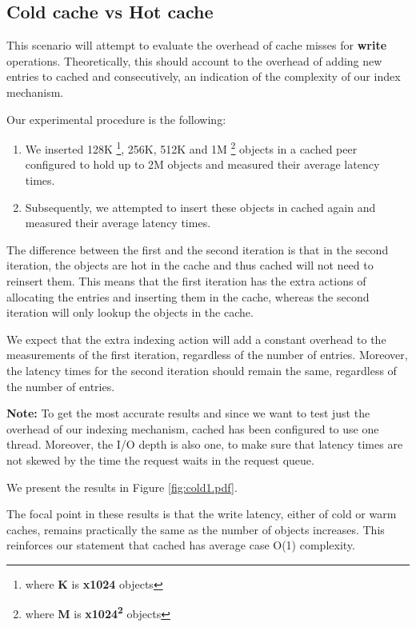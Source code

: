 \subsection{Cold cache vs Hot cache}

This scenario will attempt to evaluate the overhead of cache misses for 
\textbf{write} operations. Theoretically, this should account to the overhead 
of adding new entries to cached and consecutively, an indication of the 
complexity of our index mechanism.

Our experimental procedure is the following:

\begin{enumerate}
	\item We inserted 128K
		\footnote{where \textbf{K} is \textbf{x1024} objects}, 256K, 512K and 
		1M
		\footnote{where \textbf{M} is \textbf{x1024\textsuperscript{2}} 
			objects}
		objects in a cached peer configured to hold up to 2M objects and 
		measured their average latency times.
	\item Subsequently, we attempted to insert these objects in cached again 
		and measured their average latency times.
\end{enumerate}

The difference between the first and the second iteration is that in the second 
iteration, the objects are hot in the cache and thus cached will not need to 
reinsert them. This means that the first iteration has the extra actions of 
allocating the entries and inserting them in the cache, whereas the second 
iteration will only lookup the objects in the cache.

We expect that the extra indexing action will add a constant overhead to the 
measurements of the first iteration, regardless of the number of entries.
Moreover, the latency times for the second iteration should remain the same, 
regardless of the number of entries.

\textbf{Note:} To get the most accurate results and since we want to test just 
the overhead of our indexing mechanism, cached has been configured to use one 
thread.  Moreover, the I/O depth is also one, to make sure that latency times 
are not skewed by the time the request waits in the request queue.

We present the results in Figure \ref{fig:cold1.pdf}.


The focal point in these results is that the write latency, either of cold or 
warm caches, remains practically the same as the number of objects increases.  
This reinforces our statement that cached has average case O(1) complexity.


